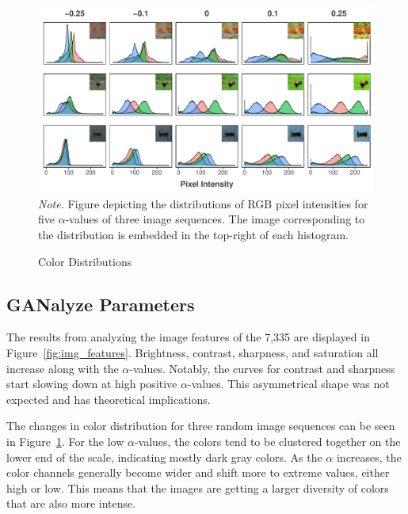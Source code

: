 \documentclass[../main.tex]{subfiles}
\begin{document}
\begin{figure}[!t]
	\caption{Color Distributions}
	\label{fig:col_dists}
	\includegraphics[width=1\linewidth]{images/results/col_dists_edit.pdf}
	{\textit{Note.} Figure depicting the distributions of RGB pixel intensities for five $\alpha$-values of three image sequences. The image corresponding to the distribution is embedded in the top-right of each histogram.}
\end{figure}

\subsection{GANalyze Parameters}
The results from analyzing the image features of the 7,335 are displayed in Figure~\ref{fig:img_features}. Brightness, contrast, sharpness, and saturation all increase along with the $\alpha$-values. Notably, the curves for contrast and sharpness start slowing down at high positive $\alpha$-values. This asymmetrical shape was not expected and has theoretical implications.

The changes in color distribution for three random image sequences can be seen in Figure~\ref{fig:col_dists}. For the low $\alpha$-values, the colors tend to be clustered together on the lower end of the scale, indicating mostly dark gray colors. As the $\alpha$ increases, the color channels generally become wider and shift more to extreme values, either high or low. This means that the images are getting a larger diversity of colors that are also more intense.
\end{document}
